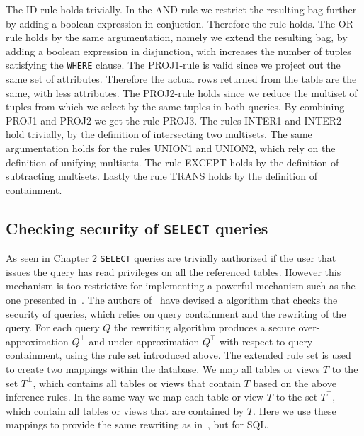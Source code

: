 The ID-rule holds trivially.
%
In the AND-rule we restrict the resulting bag further by adding a boolean expression in conjuction. 
%
Therefore the rule holds.
%
The OR-rule holds by the same argumentation, namely we extend the resulting bag, by adding a boolean expression in disjunction, wich increases the number of tuples satisfying the \texttt{WHERE} clause.
%
The PROJ1-rule is valid since we project out the same set of attributes. Therefore the actual rows returned from the table are the same, with less attributes.
%
%
The PROJ2-rule holds since we reduce the multiset of tuples from which we select by the same tuples in both queries.
%
By combining PROJ1 and PROJ2 we get the rule PROJ3.
%
The rules INTER1 and INTER2 hold trivially, by the definition of intersecting two multisets.
%
The same argumentation holds for the rules UNION1 and UNION2, which rely on the definition of unifying multisets.
%
The rule EXCEPT holds by the definition of subtracting multisets.
%
Lastly the rule TRANS holds by the definition of containment.

\FloatBarrier
\subsection{Checking security of \texttt{SELECT} queries}

As seen in Chapter 2 \texttt{SELECT} queries are trivially authorized if the user that issues the query has read privileges on all the referenced tables.
%
However this mechanism is too restrictive for implementing a powerful mechanism such as the one presented in~\cite{guarnieri2016strong}.
%
The authors of~\cite{guarnieri2016strong} have devised a algorithm that checks the security of queries, which relies on query containment and the rewriting of the query.
%
For each query $Q$ the rewriting algorithm produces a secure over-approximation $Q^\bot$ and under-approximation $Q^\top$ with respect to query containment, using the rule set introduced above.
%
The extended rule set is used to create two mappings within the database.
%
We map all tables or views $T$ to the set $T^\bot$, which contains all tables or views that contain $T$ based on the above inference rules.
%
In the same way we map each table or view $T$ to the set $T^\top$, which contain all tables or views that are contained by $T$.
%
Here we use these mappings to provide the same rewriting as in~\cite{guarnieri2016strong}, but for SQL.

